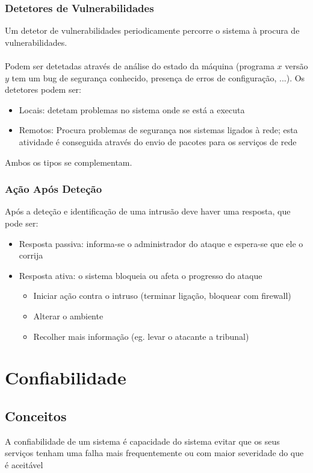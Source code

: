 \documentclass[10pt,a4paper]{report}
\begin{document}
\subsection{Detetores de Vulnerabilidades}
Um detetor de vulnerabilidades periodicamente percorre o sistema à procura de vulnerabilidades.\\
\\
Podem ser detetadas através de análise do estado da máquina (programa $x$ versão $y$ tem um bug de segurança conhecido, presença de erros de configuração, ...). Os detetores podem ser:
\begin{itemize}
\item Locais: detetam problemas no sistema onde se está a executa
\item Remotos: Procura problemas de segurança nos sistemas ligados à rede; esta
atividade é conseguida através do envio de pacotes para os serviços de rede
\end{itemize}
Ambos os tipos se complementam.
\subsection{Ação Após Deteção}
Após a deteção e identificação de uma intrusão deve haver uma resposta, que pode ser:
\begin{itemize}
\item Resposta passiva: informa-se o administrador do ataque e espera-se que ele o corrija
\item Resposta ativa: o sistema bloqueia ou afeta o progresso do ataque
\begin{itemize}
\item Iniciar ação contra o intruso (terminar ligação, bloquear com firewall)
\item Alterar o ambiente
\item Recolher mais informação (eg. levar o atacante a tribunal)
\end{itemize}
\end{itemize}

\chapter{Confiabilidade}
\section{Conceitos}
A confiabilidade de um sistema é capacidade do sistema evitar que os seus serviços tenham uma falha mais frequentemente ou com maior severidade do que é
aceitável
\end{document}
